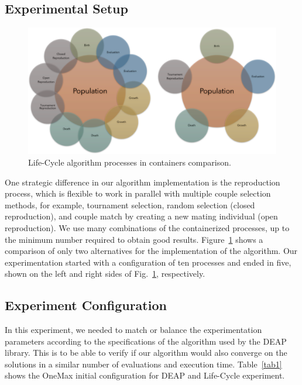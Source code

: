 \documentclass[runningheads]{llncs}
\begin{document}
\subsection{Experimental Setup}

\begin{figure}
    \includegraphics[width=\textwidth]{img/fig5_processes_containers.pdf}
    \caption{Life-Cycle algorithm processes in containers comparison.} \label{fig5}
    \end{figure}

One strategic difference in our algorithm implementation is the reproduction
process, which is flexible to work in parallel with multiple couple selection
methods, for example, tournament selection, random selection (closed
reproduction), and couple match by creating a new mating individual (open
reproduction). We use many combinations of the containerized processes, up to
the minimum number required to obtain good results. Figure~\ref{fig5} shows a comparison
of only two alternatives for the implementation of the algorithm. Our
experimentation started with a configuration of ten processes and ended in
five, shown on the left and right sides of Fig.~\ref{fig5}, respectively.

\subsection{Experiment Configuration}

In this experiment, we needed to match or balance the experimentation
parameters according to the specifications of the algorithm used by the DEAP
library. This is to be able to verify if our algorithm would also converge on
the solutions in a similar number of evaluations and execution time.
Table~\ref{tab1} shows the OneMax initial configuration for DEAP and Life-Cycle
experiment.
\end{document}
